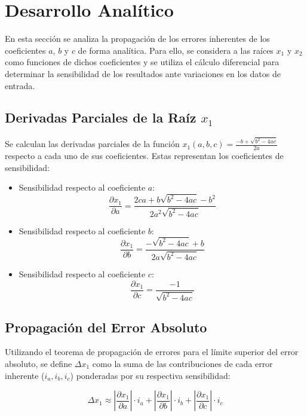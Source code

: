 \section{Desarrollo Analítico}

En esta sección se analiza la propagación de los errores inherentes de los coeficientes $a$, $b$ y $c$ de forma analítica. Para ello, se considera a las raíces $x_1$ y $x_2$ como funciones de dichos coeficientes y se utiliza el cálculo diferencial para determinar la sensibilidad de los resultados ante variaciones en los datos de entrada.

\subsection{Derivadas Parciales de la Raíz $x_1$}

Se calculan las derivadas parciales de la función $x_1(a, b, c) = \frac{-b + \sqrt{b^2 - 4ac}}{2a}$ respecto a cada uno de sus coeficientes. Estas representan los coeficientes de sensibilidad:

\begin{itemize}
    \item Sensibilidad respecto al coeficiente $a$:
    $$\frac{\partial x_1}{\partial a} = \frac{2ca+b\sqrt{b^2-4ac}-b^2}{2a^2\sqrt{b^2-4ac}}$$

    \item Sensibilidad respecto al coeficiente $b$:
    $$\frac{\partial x_1}{\partial b} = \frac{-\sqrt{b^2-4ac}+b}{2a\sqrt{b^2-4ac}}$$

    \item Sensibilidad respecto al coeficiente $c$:
    $$\frac{\partial x_1}{\partial c} = \frac{-1}{\sqrt{b^2-4ac}}$$
\end{itemize}

\subsection{Propagación del Error Absoluto}

Utilizando el teorema de propagación de errores para el límite superior del error absoluto, se define $\Delta x_1$ como la suma de las contribuciones de cada error inherente ($i_a, i_b, i_c$) ponderadas por su respectiva sensibilidad:

$$\Delta x_1 \approx \left| \frac{\partial x_1}{\partial a} \right| \cdot i_a + \left| \frac{\partial x_1}{\partial b} \right| \cdot i_b + \left| \frac{\partial x_1}{\partial c} \right| \cdot i_c$$


